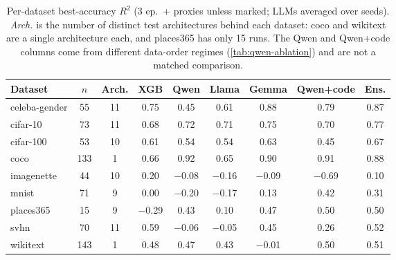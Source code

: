 \begin{table}[t]
\centering
\small
\caption{Per-dataset best-accuracy $R^2$ (3 ep.\ + proxies unless marked; LLMs averaged over seeds). \emph{Arch.} is the number of distinct test architectures behind each dataset: coco and wikitext are a single architecture each, and places365 has only 15 runs. The Qwen and Qwen+code columns come from different data-order regimes (\cref{tab:qwen-ablation}) and are not a matched comparison.}
\label{tab:per-dataset}
\begin{tabular}{lcccccccc}
\toprule
Dataset & $n$ & Arch. & XGB & Qwen & Llama & Gemma & Qwen+code & Ens. \\
\midrule
celeba-gender & 55 & 11 & 0.75 & 0.45 & 0.61 & 0.88 & 0.79 & 0.87 \\
cifar-10 & 73 & 11 & 0.68 & 0.72 & 0.71 & 0.75 & 0.70 & 0.77 \\
cifar-100 & 53 & 10 & 0.61 & 0.54 & 0.54 & 0.63 & 0.45 & 0.67 \\
coco & 133 & 1 & 0.66 & 0.92 & 0.65 & 0.90 & 0.91 & 0.88 \\
imagenette & 44 & 10 & 0.20 & $-$0.08 & $-$0.16 & $-$0.09 & $-$0.69 & 0.10 \\
mnist & 71 & 9 & 0.00 & $-$0.20 & $-$0.17 & 0.13 & 0.42 & 0.31 \\
places365 & 15 & 9 & $-$0.29 & 0.43 & 0.10 & 0.47 & 0.50 & 0.50 \\
svhn & 70 & 11 & 0.59 & $-$0.06 & $-$0.05 & 0.45 & 0.26 & 0.52 \\
wikitext & 143 & 1 & 0.48 & 0.47 & 0.43 & $-$0.01 & 0.50 & 0.51 \\
\bottomrule
\end{tabular}
\end{table}
